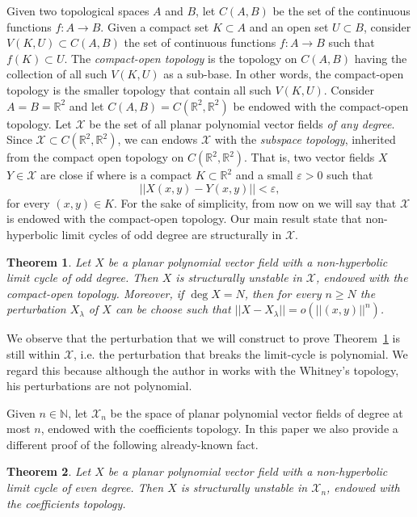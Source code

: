 \documentclass[11pt]{amsart}
\newtheorem{theorem}{Theorem}
\begin{document}
Given two topological spaces $A$ and $B$, let $C(A,B)$ be the set of the continuous functions $f\colon A\to B$. Given a compact set $K\subset A$ and an open set $U\subset B$, consider $V(K,U)\subset C(A,B)$ the set of continuous functions $f\colon A\to B$ such that $f(K)\subset U$. The \emph{compact-open topology} is the topology on $C(A,B)$ having the collection of all such $V(K,U)$ as a sub-base. In other words, the compact-open topology is the smaller topology that contain all such $V(K,U)$. Consider $A=B=\mathbb{R}^2$ and let $C(A,B)=C(\mathbb{R}^2,\mathbb{R}^2)$ be endowed with the compact-open topology. Let $\mathcal{X}$ be the set of all planar polynomial vector fields \emph{of any degree}. Since $\mathcal{X}\subset C(\mathbb{R}^2,\mathbb{R}^2)$, we can endows $\mathcal{X}$ with the \emph{subspace topology}, inherited from the compact open topology on $C(\mathbb{R}^2,\mathbb{R}^2)$. That is, two vector fields $X$ $Y\in\mathcal{X}$ are close if where is a compact $K\subset\mathbb{R}^2$ and a small $\varepsilon>0$ such that
	\[||X(x,y)-Y(x,y)||<\varepsilon,\]
for every $(x,y)\in K$. For the sake of simplicity, from now on we will say that $\mathcal{X}$ is endowed with the compact-open topology. Our main result state that non-hyperbolic limit cycles of odd degree are structurally in $\mathcal{X}$.

\begin{theorem}\label{T1}
	Let $X$ be a planar polynomial vector field with a non-hyperbolic limit cycle of odd degree. Then $X$ is structurally unstable in $\mathcal{X}$, endowed with the compact-open topology. Moreover, if $\deg X=N$, then for every $n\geqslant N$ the perturbation $X_\lambda$ of $X$ can be choose such that $||X-X_\lambda||=o(||(x,y)||^n)$.
\end{theorem}

We observe that the perturbation that we will construct to prove Theorem~\ref{T1} is still within $\mathcal{X}$, i.e. the perturbation that breaks the limit-cycle is polynomial. We regard this because although the author in \cite{Sha1987} works with the Whitney's topology, his perturbations are not polynomial. 

Given $n\in\mathbb{N}$, let $\mathcal{X}_n$ be the space of planar polynomial vector fields of degree at most $n$, endowed with the coefficients topology. In this paper we also provide a different proof of the following already-known fact.

\begin{theorem}\label{T2}
	Let $X$ be a planar polynomial vector field with a non-hyperbolic limit cycle of even degree. Then $X$ is structurally unstable in $\mathcal{X}_n$, endowed with the coefficients topology. 
\end{theorem}
\end{document}
